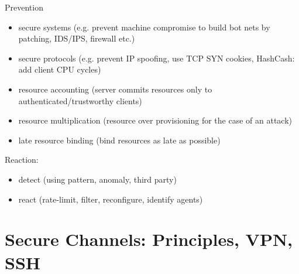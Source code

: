 \documentclass[fs, footer]{latex4ei}
\begin{document}
\begin{multicols*}{4}
{Prevention
\begin{itemize}
	\item secure systems (e.g. prevent machine compromise to build bot
	nets by patching, IDS/IPS, firewall etc.)
	\item secure protocols (e.g. prevent IP spoofing, use TCP SYN
	cookies, HashCash: add client CPU cycles)
	\item resource accounting (server commits resources only to
	authenticated/trustworthy clients)
	\item resource multiplication (resource over provisioning for the case
	of an attack)
	\item late resource binding (bind resources as late as possible)
\end{itemize}

Reaction:
\begin{itemize}
	\item detect (using pattern, anomaly, third party)
	\item react (rate-limit, filter, reconfigure, identify agents)
\end{itemize}
}
\section{Secure Channels: Principles, VPN, SSH}

\end{multicols*}
\end{document}
